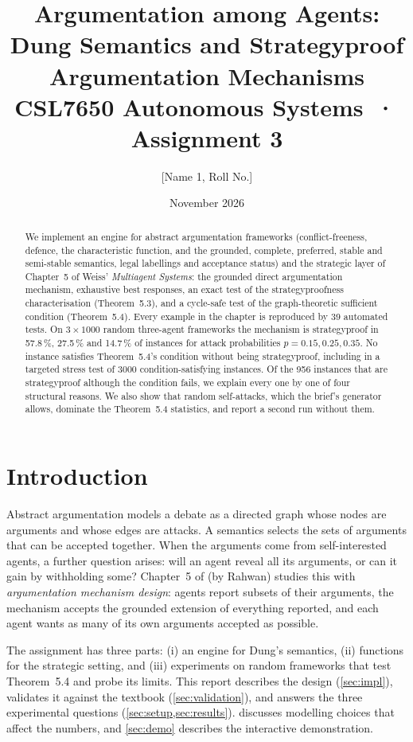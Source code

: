 \documentclass[11pt,a4paper]{article}
\title{\textbf{Argumentation among Agents:\\ Dung Semantics and Strategyproof Argumentation Mechanisms}\\[4pt]
\large CSL7650 Autonomous Systems \,·\, Assignment 3}
\author{%
  [Name 1, Roll No.] \qquad [Name 2, Roll No.]}
\date{November 2026}
\theoremstyle{definition}
\begin{document}
\maketitle

\begin{abstract}
We implement an engine for abstract argumentation frameworks (conflict-freeness, defence, the
characteristic function, and the grounded, complete, preferred, stable and semi-stable semantics,
legal labellings and acceptance status) and the strategic layer of Chapter~5 of Weiss'
\emph{Multiagent Systems}: the grounded direct argumentation mechanism, exhaustive best responses,
an exact test of the strategyproofness characterisation (Theorem~5.3), and a cycle-safe test of the
graph-theoretic sufficient condition (Theorem~5.4). Every example in the chapter is reproduced by
39 automated tests. On $3\times1000$ random three-agent frameworks the mechanism is strategyproof in
57.8\,\%, 27.5\,\% and 14.7\,\% of instances for attack probabilities $p=0.15,0.25,0.35$. No instance
satisfies Theorem~5.4's condition without being strategyproof, including in a targeted stress test of
3000 condition-satisfying instances. Of the 956 instances that are strategyproof although the
condition fails, we explain every one by one of four structural reasons. We also show that random
self-attacks, which the brief's generator allows, dominate the Theorem~5.4 statistics, and report a
second run without them.
\end{abstract}

\section{Introduction}

Abstract argumentation \cite{dung1995} models a debate as a directed graph whose nodes are arguments
and whose edges are attacks. A semantics selects the sets of arguments that can be accepted together.
When the arguments come from self-interested agents, a further question arises: will an agent reveal
all its arguments, or can it gain by withholding some? Chapter~5 of \cite{weiss2013} (by Rahwan)
studies this with \emph{argumentation mechanism design}: agents report subsets of their arguments,
the mechanism accepts the grounded extension of everything reported, and each agent wants as many of
its own arguments accepted as possible.

The assignment has three parts: (i) an engine for Dung's semantics, (ii) functions for the strategic
setting, and (iii) experiments on random frameworks that test Theorem~5.4 and probe its limits. This
report describes the design (\cref{sec:impl}), validates it against the textbook
(\cref{sec:validation}), and answers the three experimental questions (\cref{sec:setup,sec:results}).
 discusses modelling choices that affect the numbers, and \cref{sec:demo}
describes the interactive demonstration.
\end{document}
